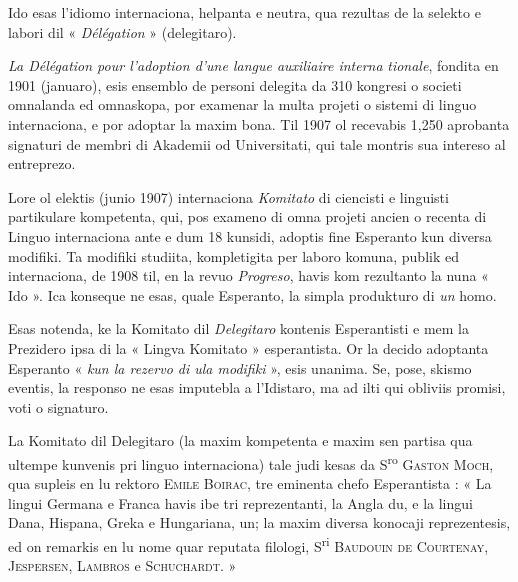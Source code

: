 \begin{VUpage}[4]{}
\VUfiletA[1.44pt]{23.66mm}{8.13mm}
\vspace*{4.61mm}
\VUpageSerre{8.26pt}{7.95pt}
\setlength{\parindent}{2.88mm}

Ido esas l'idiomo internaciona, helpanta e neutra, qua rezultas\nl
de la selekto e labori dil « \textit{Délégation} » (delegitaro).

\VUblanc{1.86pt}\textit{La Délégation pour l'adoption d'une langue auxiliaire interna}\cc
\textit{tionale}, fondita en 1901 (januaro), esis ensemblo de personi delegita\nl
da 310 kongresi o societi omnalanda ed omnaskopa, por examenar la\nl
multa projeti o sistemi di linguo internaciona, e por adoptar la\nl
maxim bona. Til 1907 ol recevabis 1,250 aprobanta signaturi de\nl
membri di Akademii od Universitati, qui tale montris sua intereso\nl
al entreprezo.

\VUblanc{1.86pt}Lore ol elektis (junio 1907) internaciona \textit{Komitato} di ciencisti e\nl
linguisti partikulare kompetenta, qui, pos exameno di omna projeti\nl
ancien o recenta di Linguo internaciona ante e dum 18 kunsidi,\nl
adoptis fine Esperanto kun diversa modifiki. Ta modifiki studiita,\nl
kompletigita per laboro komuna, publik ed internaciona, de 1908 til, en la revuo \textit{Progreso}, havis kom rezultanto la nuna « Ido ».\nl
Ica konseque ne esas, quale Esperanto, la simpla produkturo di \textit{un}\nl
homo.

\VUblanc{1.86pt}Esas notenda, ke la Komitato dil \textit{Delegitaro} kontenis Esperantisti\nl
e mem la Prezidero ipsa di la « Lingva Komitato » esperantista.\nl
Or la decido adoptanta Esperanto « \textit{kun la rezervo di ula modifiki} »,\nl
esis unanima. Se, pose, skismo eventis, la responso ne esas imputebla\nl
a l'Idistaro, ma ad ilti qui obliviis promisi, voti o signaturo.

\VUblanc{1.86pt}La Komitato dil Delegitaro (la maxim kompetenta e maxim sen\cc
partisa qua ultempe kunvenis pri linguo internaciona) tale judi\cc
kesas da S\textsuperscript{ro} \textsc{Gaston Moch}, qua supleis en lu rektoro \textsc{Emile Boirac},\nl
tre eminenta chefo Esperantista : « La lingui Germana e Franca\nl
havis ibe tri reprezentanti, la Angla du, e la lingui Dana, Hispana,\nl
Greka e Hungariana, un; la maxim diversa konocaji reprezentesis,\nl
ed on remarkis en lu nome quar reputata filologi, S\textsuperscript{ri} \textsc{Baudouin}\nl
\textsc{de Courtenay}, \textsc{Jespersen}, \textsc{Lambros} e \textsc{Schuchardt}. »


\end{VUpage}
